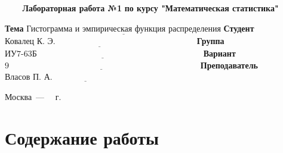 \documentclass[a4paper,14pt, unknownkeysallowed]{extreport}
\begin{document}
\begin{titlepage}
	
	\begin{center}
		\noindent\begin{minipage}{1.3\textwidth}\centering
		\Large\textbf{   ~~~ Лабораторная работа №1}\newline
		\textbf{по курсу "Математическая статистика"}\newline\newline\newline\newline
		\end{minipage}
	\end{center}
	
	\noindent\textbf{Тема} 			$\underline{\text{Гистограмма и эмпирическая функция распределения}}$\newline\newline
	\noindent\textbf{Студент} 		$\underline{\text{Ковалец К. Э.~~~~~~~~~~~~~~~~~~~~~~~~~~~~~~~~~~~~~~~~~~~~~~~~~~}}$\newline\newline
	\noindent\textbf{Группа} 		$\underline{\text{ИУ7-63Б~~~~~~~~~~~~~~~~~~~~~~~~~~~~~~~~~~~~~~~~~~~~~~~~~~~~~~~~~~~}}$\newline\newline
	\noindent\textbf{Вариант} 		$\underline{\text{9~~~~~~~~~~~~~~~~~~~~~~~~~~~~~~~~~~~~~~~~~~~~~~~~~~~~~~~~~~~~~~~~~~~~}}$\newline\newline
	\noindent\textbf{Преподаватель} $\underline{\text{Власов П. А.~~~~~~~~~~~~~~~~~~~~~~~~~~~~~~~~~~~~~~~~~}}$\newline
	
	\begin{center}
		\vfill
		Москва~---~\the\year
		~г.
	\end{center}
	\restoregeometry
\end{titlepage}



\setcounter{page}{2}

\chapter{Содержание работы}
\end{document}
